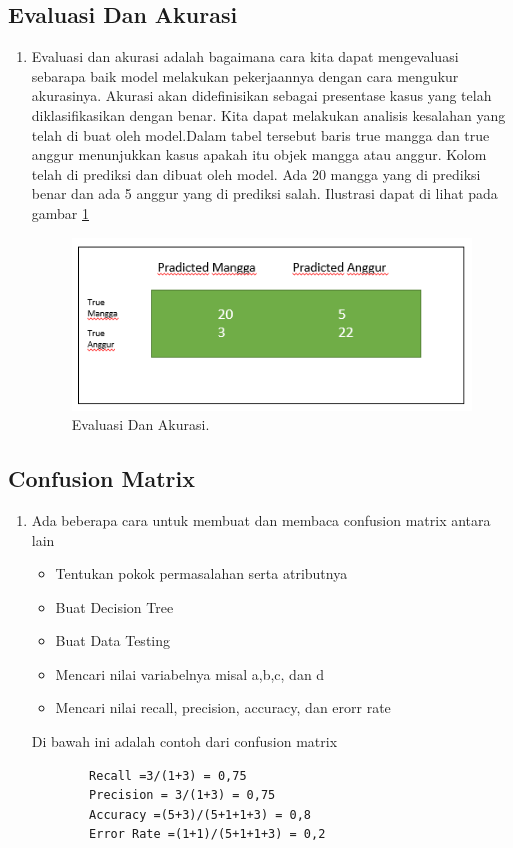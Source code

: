 \subsection{Evaluasi Dan Akurasi}
\begin{enumerate}
\item Evaluasi dan akurasi adalah bagaimana cara kita dapat mengevaluasi sebarapa baik model melakukan pekerjaannya dengan cara mengukur akurasinya. Akurasi akan didefinisikan sebagai presentase kasus yang telah diklasifikasikan dengan benar. Kita dapat melakukan analisis kesalahan yang telah di buat oleh model.Dalam tabel tersebut baris true mangga dan true anggur menunjukkan kasus apakah itu objek mangga atau anggur. Kolom telah di prediksi dan dibuat oleh model. Ada 20 mangga yang di prediksi benar dan ada 5 anggur yang di prediksi salah. Ilustrasi dapat di lihat pada gambar \ref{YEA}

		\begin{figure}[ht]
		\centerline{\includegraphics[width=1\textwidth]{figures/YN/YN54.png}}
		\caption{Evaluasi Dan Akurasi.}
		\label{YEA}
		\end{figure}
\end{enumerate}

\subsection{Confusion Matrix}
\begin{enumerate}
\item Ada beberapa cara untuk membuat dan membaca confusion matrix antara lain
	\begin{itemize}
		\item Tentukan pokok permasalahan serta atributnya
		\item Buat Decision Tree
		\item Buat Data Testing
		\item Mencari nilai variabelnya misal a,b,c, dan d
		\item Mencari nilai recall, precision, accuracy, dan erorr rate
	\end{itemize}
\subitem Di bawah ini adalah contoh dari confusion matrix
	\begin{verbatim}
		Recall =3/(1+3) = 0,75
		Precision = 3/(1+3) = 0,75
		Accuracy =(5+3)/(5+1+1+3) = 0,8
		Error Rate =(1+1)/(5+1+1+3) = 0,2 
	\end{verbatim}
\end{enumerate}

